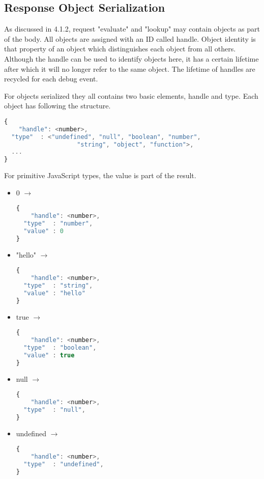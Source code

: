 \subsection {Response Object Serialization}
As discussed in 4.1.2, request "evaluate" and "lookup" may contain objects as part of the body. All objects are assigned with an ID called handle. Object identity\cite{Khoshafian:1986:OI:960112.28739} is that property of an object which distinguishes each object from all others. Although the handle can be used to identify objects here, it has a certain lifetime after which it will no longer refer to the same object. The lifetime of handles are recycled for each debug event.

For objects serialized they all contains two basic elements, handle and type. Each object has following the structure.

\begin{lstlisting}[language=JavaScript]
{
	"handle": <number>,
  "type"  : <"undefined", "null", "boolean", "number",
  					"string", "object", "function">,
  ...
}
\end{lstlisting}

For primitive JavaScript types, the value is part of the result.

\begin {itemize}
\item 0 \(\rightarrow\)
\begin{lstlisting}[language=JavaScript]
{
	"handle": <number>,
  "type"  : "number",
  "value" : 0
}
\end{lstlisting}
\item "hello" \(\rightarrow\)
\begin{lstlisting}[language=JavaScript]
{
	"handle": <number>,
  "type"  : "string",
  "value" : "hello"
}
\end{lstlisting}
\item true \(\rightarrow\)
\begin{lstlisting}[language=JavaScript]
{
	"handle": <number>,
  "type"  : "boolean",
  "value" : true
}
\end{lstlisting}
\item null \(\rightarrow\)
\begin{lstlisting}[language=JavaScript]
{
	"handle": <number>,
  "type"  : "null",
}
\end{lstlisting}
\item undefined \(\rightarrow\)
\begin{lstlisting}[language=JavaScript]
{
	"handle": <number>,
  "type"  : "undefined",
}
\end{lstlisting}
\end {itemize}


